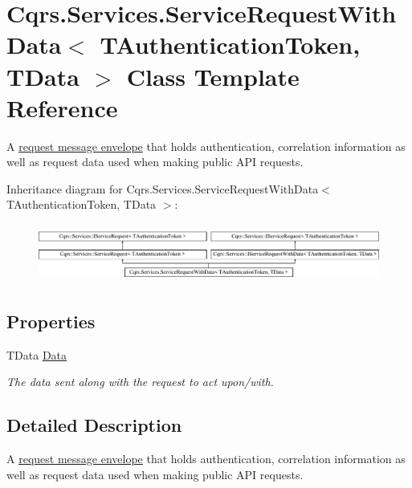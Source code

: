 \hypertarget{classCqrs_1_1Services_1_1ServiceRequestWithData}{}\section{Cqrs.\+Services.\+Service\+Request\+With\+Data$<$ T\+Authentication\+Token, T\+Data $>$ Class Template Reference}
\label{classCqrs_1_1Services_1_1ServiceRequestWithData}


A \hyperlink{}{request message envelope} that holds authentication, correlation information as well as request data used when making public A\+PI requests.  


Inheritance diagram for Cqrs.\+Services.\+Service\+Request\+With\+Data$<$ T\+Authentication\+Token, T\+Data $>$\+:\begin{figure}[H]
\begin{center}
\leavevmode
\includegraphics[height=1.926605cm]{classCqrs_1_1Services_1_1ServiceRequestWithData}
\end{center}
\end{figure}
\subsection*{Properties}
\begin{DoxyCompactItemize}
\item 
T\+Data \hyperlink{classCqrs_1_1Services_1_1ServiceRequestWithData_aab0d15e170d06c7170be934f9705937b_aab0d15e170d06c7170be934f9705937b}{Data}
\begin{DoxyCompactList}\small\item\em The data sent along with the request to act upon/with. \end{DoxyCompactList}\end{DoxyCompactItemize}


\subsection{Detailed Description}
A \hyperlink{}{request message envelope} that holds authentication, correlation information as well as request data used when making public A\+PI requests. 


